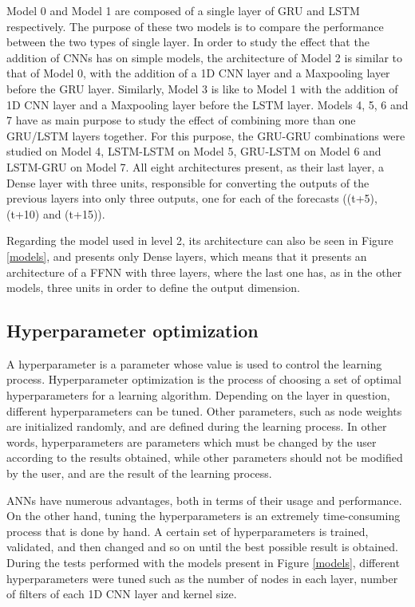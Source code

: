 Model 0 and Model 1 are composed of a single layer of \ac{GRU} and \ac{LSTM} respectively. The purpose of these two models is to compare the performance between the two types of single layer. In order to study the effect that the addition of \ac{CNN}s has on simple models, the architecture of Model 2 is similar to that of Model 0, with the addition of a \ac{1D CNN} layer and a Maxpooling layer before the \ac{GRU} layer. Similarly, Model 3 is like to Model 1 with the addition of \ac{1D CNN} layer and a Maxpooling layer before the \ac{LSTM} layer. Models 4, 5, 6 and 7 have as main purpose to study the effect of combining more than one \ac{GRU}/\ac{LSTM} layers together. For this purpose, the \ac{GRU}-\ac{GRU} combinations were studied on Model 4, \ac{LSTM}-\ac{LSTM} on Model 5, \ac{GRU}-\ac{LSTM} on Model 6 and \ac{LSTM}-\ac{GRU} on Model 7. All eight architectures present, as their last layer, a Dense layer with three units, responsible for converting the outputs of the previous layers into only three outputs, one for each of the forecasts ((t+5), (t+10) and (t+15)).

Regarding the model used in level 2, its architecture can also be seen in Figure \ref{models}, and presents only Dense layers, which means that it presents an architecture of a \ac{FFNN} with three layers, where the last one has, as in the other models, three units in order to define the output dimension.



\subsection{Hyperparameter optimization}

A hyperparameter is a parameter whose value is used to control the learning process. Hyperparameter optimization is the process of choosing a set of optimal hyperparameters for a learning algorithm. Depending on the layer in question, different hyperparameters can be tuned. Other parameters, such as node weights are initialized randomly, and are defined during the learning process. In other words, hyperparameters are parameters which must be changed by the user according to the results obtained, while other parameters should not be modified by the user, and are the result of the learning process.

\ac{ANN}s have numerous advantages, both in terms of their usage and performance. On the other hand, tuning the hyperparameters is an extremely time-consuming process that is done by hand. A certain set of hyperparameters is trained, validated, and then changed and so on until the best possible result is obtained. During the tests performed with the models present in Figure \ref{models}, different hyperparameters were tuned such as the number of nodes in each layer, number of filters of each \ac{1D CNN} layer and kernel size.

